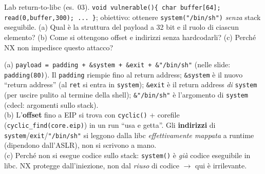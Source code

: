 \question[7]
Lab return-to-libc (es.\ 03). \lstinline|void vulnerable(){ char buffer[64]; read(0,buffer,300); ... }|; obiettivo: ottenere \lstinline|system("/bin/sh")| \emph{senza} stack eseguibile.
(a) Qual è la struttura del payload a 32 bit e il ruolo di ciascun elemento? (b) Come si ottengono offset e indirizzi senza hardcodarli? (c) Perché NX non impedisce questo attacco?
\begin{solution}
(a) \lstinline|payload = padding + &system + &exit + &"/bin/sh"| (nelle slide: \lstinline|padding(80)|). Il \lstinline|padding| riempie fino al return address; \lstinline|&system| è il nuovo ``return address'' (al \lstinline|ret| si entra in \lstinline|system|); \lstinline|&exit| è il return address \emph{di} \lstinline|system| (per uscire pulito al termine della shell); \lstinline|&"/bin/sh"| è l'argomento di \lstinline|system| (cdecl: argomenti sullo stack).\\
(b) L'\textbf{offset} fino a EIP si trova con \lstinline|cyclic()| + corefile (\lstinline|cyclic_find(core.eip)|) in un run ``usa e getta''. Gli \textbf{indirizzi} di \lstinline|system|/\lstinline|exit|/\lstinline|"/bin/sh"| si leggono dalla libc \emph{effettivamente mappata} a runtime (dipendono dall'ASLR), non si scrivono a mano.\\
(c) Perché non si esegue codice sullo stack: \lstinline|system()| è \emph{già} codice eseguibile in libc. NX protegge dall'iniezione, non dal \emph{riuso} di codice $\to$ qui è irrilevante.
\end{solution}
